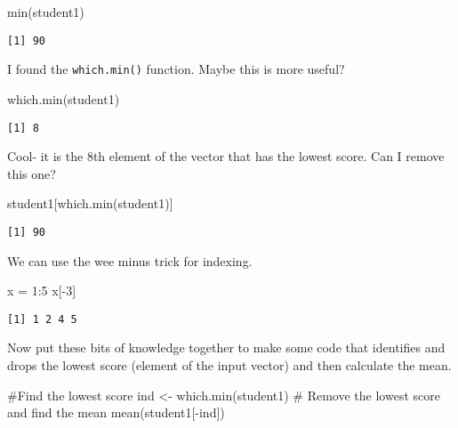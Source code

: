 \documentclass[
  letterpaper,
  DIV=11,
  numbers=noendperiod]{scrartcl}
\newenvironment{Shaded}{\begin{snugshade}}{\end{snugshade}}
\newcommand{\CommentTok}[1]{\textcolor[rgb]{0.37,0.37,0.37}{#1}}
\newcommand{\DecValTok}[1]{\textcolor[rgb]{0.68,0.00,0.00}{#1}}
\newcommand{\FunctionTok}[1]{\textcolor[rgb]{0.28,0.35,0.67}{#1}}
\newcommand{\NormalTok}[1]{\textcolor[rgb]{0.00,0.23,0.31}{#1}}
\newcommand{\OtherTok}[1]{\textcolor[rgb]{0.00,0.23,0.31}{#1}}
\newcommand{\SpecialCharTok}[1]{\textcolor[rgb]{0.37,0.37,0.37}{#1}}
\begin{document}
\begin{Shaded}
\begin{Highlighting}[]
\FunctionTok{min}\NormalTok{(student1)}
\end{Highlighting}
\end{Shaded}

\begin{verbatim}
[1] 90
\end{verbatim}

I found the \texttt{which.min()} function. Maybe this is more useful?

\begin{Shaded}
\begin{Highlighting}[]
\FunctionTok{which.min}\NormalTok{(student1)}
\end{Highlighting}
\end{Shaded}

\begin{verbatim}
[1] 8
\end{verbatim}

Cool- it is the 8th element of the vector that has the lowest score. Can
I remove this one?

\begin{Shaded}
\begin{Highlighting}[]
\NormalTok{student1[}\FunctionTok{which.min}\NormalTok{(student1)]}
\end{Highlighting}
\end{Shaded}

\begin{verbatim}
[1] 90
\end{verbatim}

We can use the wee minus trick for indexing.

\begin{Shaded}
\begin{Highlighting}[]
\NormalTok{x }\OtherTok{=} \DecValTok{1}\SpecialCharTok{:}\DecValTok{5}
\NormalTok{x[}\SpecialCharTok{{-}}\DecValTok{3}\NormalTok{]}
\end{Highlighting}
\end{Shaded}

\begin{verbatim}
[1] 1 2 4 5
\end{verbatim}

Now put these bits of knowledge together to make some code that
identifies and drops the lowest score (element of the input vector) and
then calculate the mean.

\begin{Shaded}
\begin{Highlighting}[]
\CommentTok{\#Find the lowest score}
\NormalTok{ind }\OtherTok{\textless{}{-}} \FunctionTok{which.min}\NormalTok{(student1)}
\CommentTok{\# Remove the lowest score and find the mean}
\FunctionTok{mean}\NormalTok{(student1[}\SpecialCharTok{{-}}\NormalTok{ind])}
\end{Highlighting}
\end{Shaded}
\end{document}
